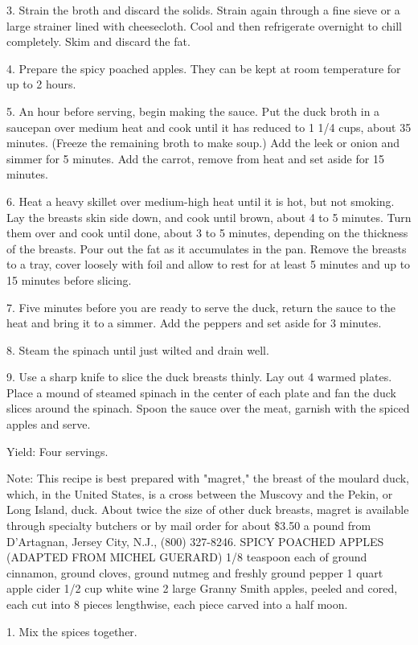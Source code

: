 3. Strain the broth and discard the solids. Strain again through a fine
sieve or a large strainer lined with cheesecloth. Cool and then
refrigerate overnight to chill completely. Skim and discard the fat.

4. Prepare the spicy poached apples. They can be kept at room
temperature for up to 2 hours.

5. An hour before serving, begin making the sauce. Put the duck broth in
a saucepan over medium heat and cook until it has reduced to 1 1/4 cups,
about 35 minutes. (Freeze the remaining broth to make soup.) Add the
leek or onion and simmer for 5 minutes. Add the carrot, remove from heat
and set aside for 15 minutes.

6. Heat a heavy skillet over medium-high heat until it is hot, but not
smoking. Lay the breasts skin side down, and cook until brown, about 4
to 5 minutes. Turn them over and cook until done, about 3 to 5 minutes,
depending on the thickness of the breasts. Pour out the fat as it
accumulates in the pan. Remove the breasts to a tray, cover loosely with
foil and allow to rest for at least 5 minutes and up to 15 minutes
before slicing.

7. Five minutes before you are ready to serve the duck, return the sauce
to the heat and bring it to a simmer. Add the peppers and set aside for
3 minutes.

8. Steam the spinach until just wilted and drain well.

9. Use a sharp knife to slice the duck breasts thinly. Lay out 4 warmed
plates. Place a mound of steamed spinach in the center of each plate and
fan the duck slices around the spinach. Spoon the sauce over the meat,
garnish with the spiced apples and serve.

Yield: Four servings.

Note: This recipe is best prepared with "magret," the breast of the
moulard duck, which, in the United States, is a cross between the
Muscovy and the Pekin, or Long Island, duck. About twice the size of
other duck breasts, magret is available through specialty butchers or by
mail order for about \$3.50 a pound from D'Artagnan, Jersey City, N.J.,
(800) 327-8246. SPICY POACHED APPLES (ADAPTED FROM MICHEL GUERARD) 1/8
teaspoon each of ground cinnamon, ground cloves, ground nutmeg and
freshly ground pepper 1 quart apple cider 1/2 cup white wine 2 large
Granny Smith apples, peeled and cored, each cut into 8 pieces
lengthwise, each piece carved into a half moon.

1. Mix the spices together.

